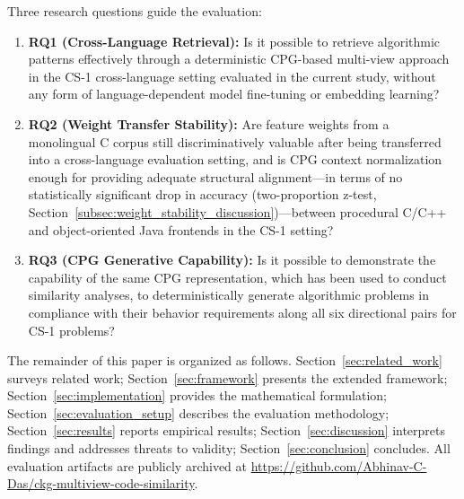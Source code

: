 Three research questions guide the evaluation:
\begin{enumerate}
    \item \textbf{RQ1 (Cross-Language Retrieval):} Is it possible to retrieve algorithmic patterns effectively through a deterministic CPG-based multi-view approach in the CS-1 cross-language setting evaluated in the current study, without any form of language-dependent model fine-tuning or embedding learning?
    \item \textbf{RQ2 (Weight Transfer Stability):} Are feature weights from a monolingual C corpus still discriminatively valuable after being transferred into a cross-language evaluation setting, and is CPG context normalization enough for providing adequate structural alignment---in terms of no statistically significant drop in accuracy (two-proportion z-test, Section~\ref{subsec:weight_stability_discussion})---between procedural C/C++ and object-oriented Java frontends in the CS-1 setting?
    \item \textbf{RQ3 (CPG Generative Capability):} Is it possible to demonstrate the capability of the same CPG representation, which has been used to conduct similarity analyses, to deterministically generate algorithmic problems in compliance with their behavior requirements along all six directional pairs for CS-1 problems?
\end{enumerate}

The remainder of this paper is organized as follows. Section~\ref{sec:related_work} surveys related work; Section~\ref{sec:framework} presents the extended framework; Section~\ref{sec:implementation} provides the mathematical formulation; Section~\ref{sec:evaluation_setup} describes the evaluation methodology; Section~\ref{sec:results} reports empirical results; Section~\ref{sec:discussion} interprets findings and addresses threats to validity; Section~\ref{sec:conclusion} concludes. All evaluation artifacts are publicly archived at \url{https://github.com/Abhinav-C-Das/ckg-multiview-code-similarity}.
